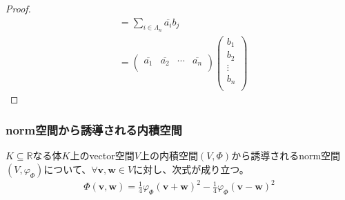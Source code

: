 \documentclass[dvipdfmx]{jsarticle}
\begin{document}
\begin{proof}
\begin{align*}
&= \sum_{i \in \varLambda_{n}} {\overline{a_{i}}b_{j}}\\
&= \begin{pmatrix}
\overline{a_{1}} & \overline{a_{2}} & \cdots & \overline{a_{n}} \\
\end{pmatrix}\begin{pmatrix}
b_{1} \\
b_{2} \\
 \vdots \\
b_{n} \\
\end{pmatrix}
\end{align*}
\end{proof}
\subsubsection{norm空間から誘導される内積空間}%
\begin{thm}\label{2.3.6.19}
$K \subseteq \mathbb{R}$なる体$K$上のvector空間$V$上の内積空間$(V,\varPhi)$から誘導されるnorm空間$\left( V,\varphi_{\varPhi} \right)$について、$\forall\mathbf{v},\mathbf{w} \in V$に対し、次式が成り立つ。
\begin{align*}
\varPhi\left( \mathbf{v},\mathbf{w} \right) = \frac{1}{4}{\varphi_{\varPhi}\left( \mathbf{v} + \mathbf{w} \right)}^{2} - \frac{1}{4}{\varphi_{\varPhi}\left( \mathbf{v} - \mathbf{w} \right)}^{2}
\end{align*}
\end{thm}
\end{document}
